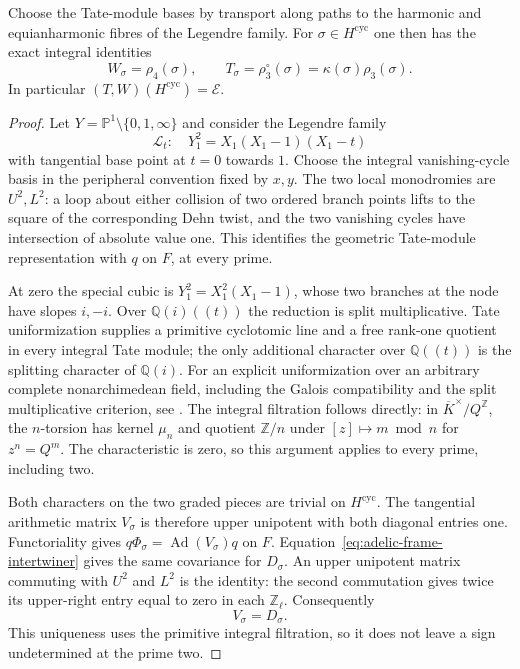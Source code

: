 \begin{proposition}\label{prop:adelic-signed-path-comparison}
Choose the Tate-module bases by transport along paths to the
harmonic and equianharmonic fibres of the Legendre family.  For
$\sigma\in H^{\mathrm{cyc}}$ one then has the exact integral
identities
\begin{equation}
 W_\sigma=\rho_4(\sigma),\qquad
 T_\sigma=\rho_3^{\circ}(\sigma)
                       =\kappa(\sigma)\rho_3(\sigma).
 \label{eq:adelic-signed-path-comparison}
\end{equation}
In particular $(T,W)(H^{\mathrm{cyc}})=\mathcal E$.
\end{proposition}

\begin{proof}
Let $Y=\mathbb P^1\setminus\{0,1,\infty\}$ and consider the
Legendre family
\[
 \mathcal L_t:\quad Y_1^2=X_1(X_1-1)(X_1-t)
\]
with tangential base point at $t=0$ towards $1$.
Choose the integral vanishing-cycle basis in the peripheral
convention fixed by $x,y$.  The two local monodromies are
$U^2,L^2$: a loop about either collision of two ordered branch
points lifts to the square of the corresponding Dehn twist, and
the two vanishing cycles have intersection of absolute value one.
This identifies the geometric Tate-module representation with $q$
on $F$, at every prime.

At zero the special cubic is $Y_1^2=X_1^2(X_1-1)$, whose two
branches at the node have slopes $i,-i$.  Over
$\mathbb Q(i)((t))$ the reduction is split multiplicative.
Tate uniformization supplies a primitive cyclotomic line and a
free rank-one quotient in every integral Tate module; the only
additional character over $\mathbb Q((t))$ is the splitting
character of $\mathbb Q(i)$.
For an explicit uniformization over an arbitrary complete
nonarchimedean field, including the Galois compatibility and the
split multiplicative criterion, see
\cite[\S2, Theorem~2.2 and pp.~3--4]{PapikianTate}.
The integral filtration follows directly: in
$\overline K^{\times}/Q^{\mathbb Z}$, the $n$-torsion has kernel
$\mu_n$ and quotient $\mathbb Z/n$ under
$[z]\mapsto m\bmod n$ for $z^n=Q^m$.
The characteristic is zero, so this argument applies to every
prime, including two.

Both characters on the two graded pieces are trivial on
$H^{\mathrm{cyc}}$.  The tangential arithmetic matrix
$V_\sigma$ is therefore upper unipotent with both diagonal
entries one.  Functoriality gives
$q\Phi_\sigma=\operatorname{Ad}(V_\sigma)q$ on $F$.
Equation~\eqref{eq:adelic-frame-intertwiner} gives the same
covariance for $D_\sigma$.
An upper unipotent matrix commuting with $U^2$ and $L^2$ is the
identity: the second commutation gives twice its upper-right
entry equal to zero in each $\mathbb Z_\ell$.
Consequently
\begin{equation}
 V_\sigma=D_\sigma.
 \label{eq:adelic-tangential-matrix}
\end{equation}
This uniqueness uses the primitive integral filtration, so it
does not leave a sign undetermined at the prime two.


\end{proof}
